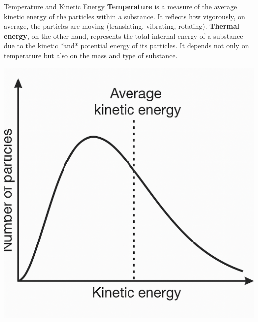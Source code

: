 \begin{keyconcept}{Temperature and Kinetic Energy}
\textbf{Temperature} is a measure of the average kinetic energy of the particles within a substance. It reflects how vigorously, on average, the particles are moving (translating, vibrating, rotating). \textbf{Thermal energy}, on the other hand, represents the total internal energy of a substance due to the kinetic *and* potential energy of its particles. It depends not only on temperature but also on the mass and type of substance.
\end{keyconcept}


\begin{marginfigure}[-20pt] %
\includegraphics[width=\linewidth]{kinetic_energy.png} %
\caption{A typical distribution of kinetic energies among particles in a substance at a given temperature. Higher temperatures shift the average energy to the right and broaden the distribution.}
\label{fig:particle_distribution}
\end{marginfigure}

